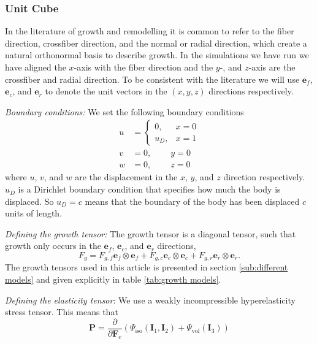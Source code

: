 \subsubsection{Unit Cube}
\label{subsec: experiments}
In the literature of growth and remodelling it is common to refer to the fiber direction, crossfiber direction, and the normal or radial direction, which create a natural orthonormal basis to describe growth. In the simulations we have run we have aligned the $x$-axis with the fiber direction and the $y$-, and $z$-axis are the crossfiber and radial direction. To be consistent with the literature we will use $\mathbf{e}_f$, $\mathbf{e}_c$, and $\mathbf{e}_r$ to denote the unit vectors in the $(x, y, z)$ directions respectively.  \par
\emph{Boundary conditions:} We set the following boundary conditions
\begin{align*}
    u &= \begin{cases}
        0, & x = 0 \\
        u_D, & x = 1
    \end{cases} \\
    v &= 0, \qquad \ y = 0 \\
    w &= 0, \qquad \ z = 0
\end{align*}
where $u$, $v$, and $w$ are the displacement in the $x$, $y$, and $z$ direction respectively. $u_D$ is a Dirichlet boundary condition that specifies how much the body is displaced. So $u_D = c$ means that the boundary of the body has been displaced $c$ units of length.
\par
\emph{Defining the growth tensor:} The growth tensor is a diagonal tensor, such that growth only occurs in the $\mathbf{e}_f$, $\mathbf{e}_c$, and $\mathbf{e}_r$ directions, 
\begin{equation*}
    F_g = F_{g,f}\mathbf{e}_f\otimes \mathbf{e}_f + F_{g,c}\mathbf{e}_c\otimes \mathbf{e}_c + F_{g,r}\mathbf{e}_r\otimes \mathbf{e}_r.
\end{equation*}
The growth tensors used in this article is presented in section \ref{sub:different models} and given explicitly in table \ref{tab:growth models}.\par
\emph{Defining the elasticity tensor}: We use a weakly incompressible hyperelasticity stress tensor. This means that
\begin{equation*}
    \mathbf{P} = \frac{\partial }{\partial \mathbf{F}_e}(\Psi_\text{iso}(\mathbf{I}_1, \mathbf{I}_2) + \Psi_\text{vol}(\mathbf{I}_3))
\end{equation*}
